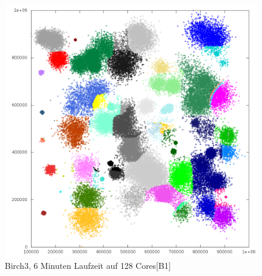 	\begin{figure}[H]
		\centering
		\includegraphics[scale=0.45]{../meanshift/output/pics/birch3_colored.png} 
		\vspace{-10pt}
		\caption{Birch3, 6 Minuten Laufzeit auf 128 Cores[B1]}
	\end{figure}
	\newpage
